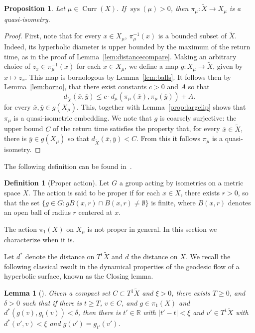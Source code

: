 \documentclass[12pt,article]{amsart}
\numberwithin{equation}{section}
\numberwithin{figure}{section}
\newtheorem{lemma}[equation]{Lemma}
\newtheorem{proposition}[equation]{Proposition}
\theoremstyle{definition}
\newtheorem{definition}[equation]{Definition}
\theoremstyle{plain}
\DeclareMathOperator{\Curr}{Curr}
\DeclareMathOperator{\sys}{sys}
\newcommand*{\wt}[1]{\widetilde{#1}}
\begin{document}
\begin{proposition}
Let $\mu \in \Curr(X)$.
If $\sys(\mu)>0$, then $\pi_{\mu} \colon \wt{X} \to X_{\mu}$ is a quasi-isometry.
\label{prop:quasi-isom}
\end{proposition}
\begin{proof}
First, note that for every $x \in X_{\mu}$, $\pi_{\mu}^{-1}(x)$ is a bounded subset of $\wt{X}$.  Indeed, its hyperbolic diameter is upper bounded by the maximum of the return time, as in the proof of Lemma~\ref{lem:distancecompare}. Making an arbitrary choice of $z_x \in \pi_{\mu}^{-1}(x)$ for each $x \in X_{\mu}$, we define a map $g \colon X_{\mu} \to \wt{X}$, given by $x \mapsto z_x$. This map is bornologous by Lemma~\ref{lem:balls}. It follows then by Lemma~\ref{lem:borno}, that there exist constants $c>0$ and $A$ so that
\[
d_{\wt{X}}(\overline{x},\overline{y})  \leq c \cdot d_{\mu}(\pi_{\mu}(\overline{x}),\pi_{\mu}(\overline{y}))   + A.
\]
for every $\overline{x}, \overline{y} \in g(X_{\mu})$. This, together with Lemma~\ref{prop:largelip} shows that $\pi_{\mu}$ is a quasi-isometric embedding.
We note that $g$ is coarsely surjective: the upper bound $C$ of the return time satisfies the property that, for every $\overline{x} \in \wt{X}$, there is $\overline{y} \in g(X_{\mu})$ so that $d_{\wt{X}}(\overline{x},\overline{y})<C$.
From this it follows $\pi_{\mu}$ is a quasi-isometry.
\end{proof}


The following definition can be found in~\cite[Definition~I.8.2]{BH11:NonPosCurvature}.
\begin{definition}[Proper action]
Let $G$ a group acting by isometries on a metric space $X$. The action is said to be proper if for each $x \in X$, there exists $r>0$, so that the set $\{ g\in G \colon g B(x,r) \cap B(x,r) \neq \emptyset \}$ is finite, where $B(x,r)$ denotes an open ball of radius $r$ centered at $x$.
\label{def:propaction}
\end{definition}

The action $\pi_1(X)$ on $X_{\mu}$ is not proper in general. In this section we characterize when it is.

Let $d^*$ denote the distance on $T^1 \wt{X}$ and $d$ the distance on $X$.
We recall the following classical result in the dynamical properties of the geodesic flow of a hyperbolic surface, known as the Closing lemma.

\begin{lemma}[{\cite[4.5.15]{Eberlein1979SurfacesON}}]
Given a compact set $C \subset T^1 \wt{X}$ and $\xi >0$, there exists $T \geq 0$, and $\delta > 0$ such that if there is $t \geq T$, $v \in C$, and $g \in \pi_1(X)$ and $d^{*}(g(v),g_t(v))<\delta$, then there is $t' \in \mathbb{R}$ with $|t' - t| < \xi$ and $v' \in T^1\wt{X}$ with $d^*(v',v) < \xi$ and $g(v')=g_{t'}(v')$. 

\label{lem:closing}
\end{lemma}
\end{document}
